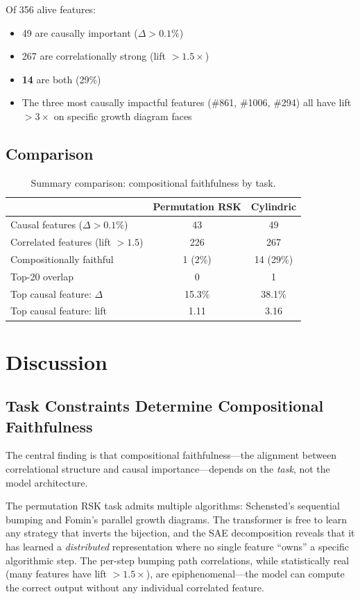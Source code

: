 \documentclass[10pt]{article}
\begin{document}
Of 356 alive features:
\begin{itemize}
\item 49 are causally important ($\Delta > 0.1\%$)
\item 267 are correlationally strong (lift $> 1.5\times$)
\item \textbf{14} are both (29\%)
\item The three most causally impactful features (\#861, \#1006, \#294) all
have lift $> 3\times$ on specific growth diagram faces
\end{itemize}

\subsection{Comparison}

\begin{table}[h]
\centering
\caption{Summary comparison: compositional faithfulness by task.}
\label{tab:comparison}
\begin{tabular}{lcc}
\toprule
& Permutation RSK & Cylindric \\
\midrule
Causal features ($\Delta > 0.1\%$) & 43 & 49 \\
Correlated features (lift $> 1.5$) & 226 & 267 \\
Compositionally faithful & 1 (2\%) & 14 (29\%) \\
Top-20 overlap & 0 & 1 \\
Top causal feature: $\Delta$ & 15.3\% & 38.1\% \\
Top causal feature: lift & 1.11 & 3.16 \\
\bottomrule
\end{tabular}
\end{table}

\section{Discussion}

\subsection{Task Constraints Determine Compositional Faithfulness}

The central finding is that compositional faithfulness---the alignment
between correlational structure and causal importance---depends on the
\emph{task}, not the model architecture.

The permutation RSK task admits multiple algorithms: Schensted's sequential
bumping and Fomin's parallel growth diagrams. The transformer is free to
learn any strategy that inverts the bijection, and the SAE decomposition
reveals that it has learned a \emph{distributed} representation where no
single feature ``owns'' a specific algorithmic step. The per-step bumping
path correlations, while statistically real (many features have lift
$> 1.5\times$), are epiphenomenal---the model can compute the correct
output without any individual correlated feature.
\end{document}
